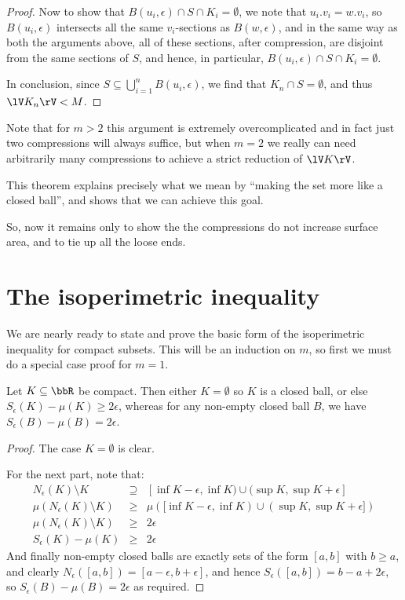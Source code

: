 \documentclass[a4paper,11pt]{article}
\begin{document}
\begin{proof}
Now to show that $B(u_i,\epsilon)\cap S\cap K_{i}=\emptyset$, we note that
$u_i.v_i=w.v_i$, so $B(u_i,\epsilon)$ intersects all the same $v_i$-sections as
$B(w,\epsilon)$, and in the same way as both the arguments above,
all of these sections, after
compression, are disjoint from the same sections of $S$, and hence,
in particular,
$B(u_i,\epsilon)\cap S\cap K_{i}=\emptyset$.

In conclusion, since $S\subseteq\bigcup_{i=1}^n B(u_i,\epsilon)$, we find
that $K_n\cap S=\emptyset$, and thus $\lV K_n\rV<M$.
\end{proof}

Note that for $m>2$ this argument is extremely overcomplicated and in fact just
two compressions will always suffice, but when $m=2$ we really can need
arbitrarily many compressions to achieve a strict reduction of $\lV K\rV$.

This theorem explains precisely what we mean by ``making the set more like a
closed ball'', and shows that we can achieve this goal.

So, now it remains only to show the the compressions do not increase surface
area, and to tie up all the loose ends.

\section{The isoperimetric inequality}
We are nearly ready to state and prove the basic form of the
isoperimetric inequality for compact subsets.  This will be an induction on
$m$, so first we must do a special case proof for $m=1$.

\begin{lemma}
Let $K\subseteq\bbR$ be compact.  Then either $K=\emptyset$ so $K$ is a closed
ball, or else $S_\epsilon(K)-\mu(K)\geq 2\epsilon$,
whereas for any non-empty closed
ball $B$, we have $S_\epsilon(B)-\mu(B)=2\epsilon$.
\end{lemma}

\begin{proof}
The case $K=\emptyset$ is clear.

For the next part, note that:
%
\begin{eqnarray*}
N_\epsilon(K)\setminus K &\supseteq&
	[\inf K-\epsilon,\inf K)\cup(\sup K,\sup K+\epsilon] \\
\mu(N_\epsilon(K)\setminus K)&\geq&
	\mu([\inf K-\epsilon,\inf K)\cup(\sup K,\sup K+\epsilon]) \\
\mu(N_\epsilon(K)\setminus K)&\geq& 2\epsilon \\
S_\epsilon(K)-\mu(K)&\geq& 2\epsilon
\end{eqnarray*}
%
And finally non-empty closed balls are exactly sets of the form $[a,b]$ with
$b\geq a$, and
clearly $N_\epsilon([a,b])=[a-\epsilon,b+\epsilon]$, and hence
$S_\epsilon([a,b])=b-a+2\epsilon$, so $S_\epsilon(B)-\mu(B)=2\epsilon$ as
required.
\end{proof}
\end{document}
